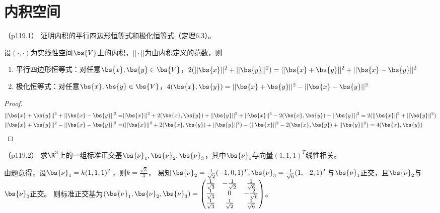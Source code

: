 \documentclass[12pt, a4paper, oneside, UTF8]{ctexbook}
\begin{document}
\else
\fi

\chapter{内积空间}
\begin{question}（p119.1）
    证明内积的平行四边形恒等式和极化恒等式（定理6.3）。

    设$(\cdot,\cdot)$为实线性空间$\bs{V}$上的内积，$||\cdot||$为由内积定义的范数，则
    \begin{enumerate}[label=(\arabic*)]
        \item 平行四边形恒等式：对任意$\bs{x},\bs{y} \in \bs{V}$，$2(||\bs{x}||^2+||\bs{y}||^2)=||\bs{x}+\bs{y}||^2+||\bs{x}-\bs{y}||^2$
        \item 极化恒等式：对任意$\bs{x},\bs{y} \in \bs{V}$，$4(\bs{x},\bs{y})=||\bs{x}+\bs{y}||^2-||\bs{x}-\bs{y}||^2$
    \end{enumerate}
\end{question}

\begin{proof}
    \begin{align*}
        ||\bs{x}+\bs{y}||^2+||\bs{x}-\bs{y}||^2=&||\bs{x}||^2+2(\bs{x},\bs{y})+||\bs{y}||^2
        +||\bs{x}||^2-2(\bs{x},\bs{y})+||\bs{y}||^2=2(||\bs{x}||^2+||\bs{y}||^2) \\
        ||\bs{x}+\bs{y}||^2-||\bs{x}-\bs{y}||^2=&(||\bs{x}||^2+2(\bs{x},\bs{y})+||\bs{y}||^2)
        -(||\bs{x}||^2-2(\bs{x},\bs{y})+||\bs{y}||^2)=4(\bs{x},\bs{y})
    \end{align*}
\end{proof}

\begin{question}（p119.2）
    求$\R^3$上的一组标准正交基$\bs{\nu}_1,\bs{\nu}_2,\bs{\nu}_3$，其中$\bs{\nu}_1$与向量$(1,1,1)^T$线性相关。
\end{question}

\begin{solution}
    由题意得，设$\bs{\nu}_1=k(1,1,1)^T$，则$k=\frac{\sqrt{3}}{3}$，
    易知$\bs{\nu}_2=\frac{1}{\sqrt{2}}(-1,0,1)^T,\bs{\nu}_3=\frac{1}{\sqrt{6}}(1,-2,1)^T$与$\bs{\nu}_1$正交，且$\bs{\nu}_2$与$\bs{\nu}_3$正交。
    则标准正交基为$(\bs{\nu}_1,\bs{\nu}_2,\bs{\nu}_3)=\begin{pmatrix}
        \frac{1}{\sqrt{3}} & -\frac{1}{\sqrt{2}} & \frac{1}{\sqrt{6}} \\
        \frac{1}{\sqrt{3}} & 0& -\frac{2}{\sqrt{6}} \\
        \frac{1}{\sqrt{3}} & \frac{1}{\sqrt{2}}& \frac{1}{\sqrt{6}}
    \end{pmatrix}$。
    
\end{solution}
\end{document}

